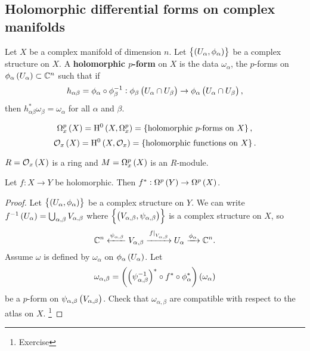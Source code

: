\pagebreak

\subsection{Holomorphic differential forms on complex manifolds}

\begin{definition}
Let $ X $ be a complex manifold of dimension $ n $. Let $ \cbr{\br{U_\alpha, \phi_\alpha}} $ be a complex structure on $ X $. A \textbf{holomorphic $ p $-form} on $ X $ is the data $ \omega_\alpha $, the $ p $-forms on $ \phi_\alpha\br{U_\alpha} \subset \CC^n $ such that if
$$ h_{\alpha\beta} = \phi_\alpha \circ \phi_\beta^{-1} : \phi_\beta\br{U_\alpha \cap U_\beta} \to \phi_\alpha\br{U_\alpha \cap U_\beta}, $$
then $ h_{\alpha\beta}^*\omega_\beta = \omega_\alpha $ for all $ \alpha $ and $ \beta $.
\end{definition}


\begin{notation}
$$ \Omega_x^p\br{X} = \H^0\br{X, \Omega_x^p} = \cbr{\text{holomorphic $ p $-forms on} \ X}, $$
$$ \OOO_x\br{X} = \H^0\br{X, \OOO_x} = \cbr{\text{holomorphic functions on} \ X}. $$
\end{notation}

$ R = \OOO_x\br{X} $ is a ring and $ M = \Omega_x^p\br{X} $ is an $ R $-module.

\begin{lemma}
Let $ f : X \to Y $ be holomorphic. Then $ f^* : \Omega^p\br{Y} \to \Omega^p\br{X} $.
\end{lemma}

\begin{proof}
Let $ \cbr{\br{U_\alpha, \phi_\alpha}} $ be a complex structure on $ Y $. We can write $ f^{-1}\br{U_\alpha} = \bigcup_{\alpha, \beta} V_{\alpha, \beta} $ where $ \cbr{\br{V_{\alpha, \beta}, \psi_{\alpha, \beta}}} $ is a complex structure on $ X $, so
$$ \mathbb{C}^n \xleftarrow{\psi_{\alpha, \beta}} V_{\alpha, \beta} \xrightarrow{\left. f \right|_{V_{\alpha, \beta}}} U_\alpha \xrightarrow{\phi_\alpha} \mathbb{C}^n. $$
Assume $ \omega $ is defined by $ \omega_\alpha $ on $ \phi_\alpha\br{U_\alpha} $. Let
$$ \omega_{\alpha, \beta} = \br{\br{\psi_{\alpha, \beta}^{-1}}^* \circ f^* \circ \phi_\alpha^*}\br{\omega_\alpha} $$
be a $ p $-form on $ \psi_{\alpha, \beta}\br{V_{\alpha, \beta}} $. Check that $ \omega_{\alpha, \beta} $ are compatible with respect to the atlas on $ X $. \footnote{Exercise}
\end{proof}

